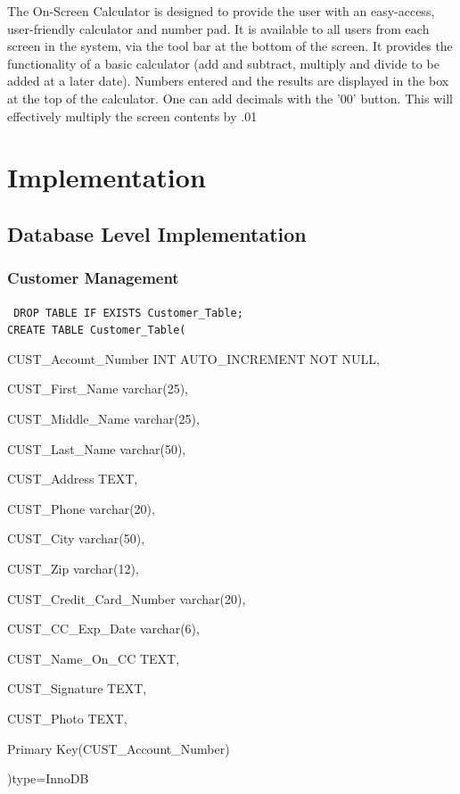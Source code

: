\documentclass{report}
\begin{document}
    The On-Screen Calculator is designed to provide the user with
    an easy-access, user-friendly calculator and number pad.  It
    is available to all users from each screen in the system, via the tool bar
    at the bottom of the screen.  It provides the functionality of
    a basic calculator (add and subtract, multiply and divide to
    be added at a later date).  Numbers entered and the results
    are displayed in the box at the top of the calculator. One can add decimals
	with the '00' button. This will effectively multiply the screen contents by .01\\

\chapter{Implementation}

    \section{Database Level Implementation}


        \subsection{Customer Management}
        {\tt\small
        DROP TABLE IF EXISTS Customer\_Table;\\

        CREATE TABLE Customer\_Table(
        \begin{list}{}
            \item{CUST\_Account\_Number INT AUTO\_INCREMENT NOT NULL,}
            \item{CUST\_First\_Name varchar(25),}
            \item{CUST\_Middle\_Name varchar(25),}
            \item{CUST\_Last\_Name varchar(50),}
            \item{CUST\_Address TEXT,}
            \item{CUST\_Phone varchar(20),}
            \item{CUST\_City varchar(50),}
            \item{CUST\_Zip varchar(12),}
            \item{CUST\_Credit\_Card\_Number varchar(20),}
            \item{CUST\_CC\_Exp\_Date varchar(6),}
            \item{CUST\_Name\_On\_CC TEXT,}
            \item{CUST\_Signature TEXT,}
            \item{CUST\_Photo TEXT,}
            \item{Primary Key(CUST\_Account\_Number)}
        \end{list}
        )type=InnoDB\\
        }
\end{document}
